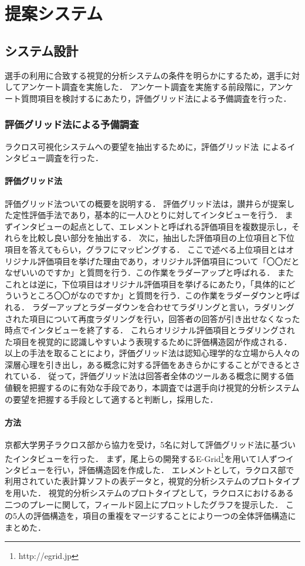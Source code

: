 \documentclass[sotsuron]{kuee}
\begin{document}
\chapter{提案システム}
	\section{システム設計}
		選手の利用に合致する視覚的分析システムの条件を明らかにするため，選手に対してアンケート調査を実施した．
		アンケート調査を実施する前段階に，アンケート質問項目を検討するにあたり，評価グリッド法による予備調査を行った．
		\subsection{評価グリッド法による予備調査}
			ラクロス可視化システムへの要望を抽出するために，評価グリッド法~\cite{EGM}によるインタビュー調査を行った．
			\subsubsection{評価グリッド法}
				評価グリッド法ついての概要を説明する．
				評価グリッド法は，讃井らが提案した定性評価手法であり，基本的に一人ひとりに対してインタビューを行う．
				まずインタビューの起点として、エレメントと呼ばれる評価項目を複数提示し，それらを比較し良い部分を抽出する．
				次に，抽出した評価項目の上位項目と下位項目を答えてもらい，グラフにマッピングする．
				ここで述べる上位項目とはオリジナル評価項目を挙げた理由であり，オリジナル評価項目について「〇〇だとなぜいいのですか」と質問を行う．この作業をラダーアップと呼ばれる．
				またこれとは逆に，下位項目はオリジナル評価項目を挙げるにあたり，「具体的にどういうところ〇〇がなのですか」と質問を行う．この作業をラダーダウンと呼ばれる．
				ラダーアップとラダーダウンを合わせてラダリングと言い，ラダリングされた項目について再度ラダリングを行い，回答者の回答が引き出せなくなった時点でインタビューを終了する．
				これらオリジナル評価項目とラダリングされた項目を視覚的に認識しやすいよう表現するために評価構造図が作成される．
				以上の手法を取ることにより，評価グリッド法は認知心理学的な立場から人々の深層心理を引き出し，ある概念に対する評価をあきらかにすることができるとされている．
				従って，評価グリッド法は回答者全体のツールある概念に関する価値観を把握するのに有効な手段であり，本調査では選手向け視覚的分析システムの要望を把握する手段として適すると判断し，採用した．
			\subsubsection{方法}
				京都大学男子ラクロス部から協力を受け，5名に対して評価グリッド法に基づいたインタビューを行った．
				まず，尾上らの開発するE-Grid\footnote{http://egrid.jp}を用いて1人ずつインタビューを行い，評価構造図を作成した．
				エレメントとして，ラクロス部で利用されていた表計算ソフトの表データと，視覚的分析システムのプロトタイプを用いた．
				視覚的分析システムのプロトタイプとして，ラクロスにおけるある二つのプレーに関して，フィールド図上にプロットしたグラフを提示した．
				この5人の評価構造を，項目の重複をマージすることにより一つの全体評価構造にまとめた．
\end{document}
